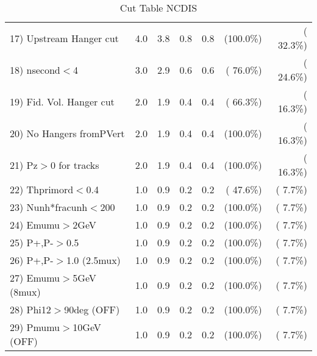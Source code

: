 \begin{table}[h!]
\begin{tabular}{||l||r|r|r|r|r|r||}
 17) Upstream Hanger cut  &          4.0 &          3.8 &          0.8 &          0.8 & (100.0\%) & ( 32.3\%) \\
 18) nsecond$<$4          &          3.0 &          2.9 &          0.6 &          0.6 & ( 76.0\%) & ( 24.6\%) \\
 19) Fid. Vol. Hanger cut &          2.0 &          1.9 &          0.4 &          0.4 & ( 66.3\%) & ( 16.3\%) \\
 20) No Hangers fromPVert &          2.0 &          1.9 &          0.4 &          0.4 & (100.0\%) & ( 16.3\%) \\
 21) Pz$>$0 for tracks    &          2.0 &          1.9 &          0.4 &          0.4 & (100.0\%) & ( 16.3\%) \\
 22) Thprimord$<$0.4      &          1.0 &          0.9 &          0.2 &          0.2 & ( 47.6\%) & (  7.7\%) \\
 23) Nunh*fracunh$<$200   &          1.0 &          0.9 &          0.2 &          0.2 & (100.0\%) & (  7.7\%) \\
 24) Emumu$>$2GeV         &          1.0 &          0.9 &          0.2 &          0.2 & (100.0\%) & (  7.7\%) \\
 25) P+,P-$>$0.5          &          1.0 &          0.9 &          0.2 &          0.2 & (100.0\%) & (  7.7\%) \\
 26) P+,P-$>$1.0 (2.5mux) &          1.0 &          0.9 &          0.2 &          0.2 & (100.0\%) & (  7.7\%) \\
 27) Emumu$>$5GeV  (8mux) &          1.0 &          0.9 &          0.2 &          0.2 & (100.0\%) & (  7.7\%) \\
 28) Phi12$>$90deg  (OFF) &          1.0 &          0.9 &          0.2 &          0.2 & (100.0\%) & (  7.7\%) \\
 29) Pmumu$>$10GeV  (OFF) &          1.0 &          0.9 &          0.2 &          0.2 & (100.0\%) & (  7.7\%) \\
 \hline
 \hline
 \end{tabular}
 \caption{Cut Table  NCDIS    }
 \label{tab-cutcohjpsi-mumu_ncdis}
 \end{table}
